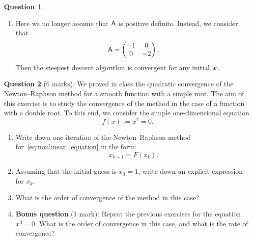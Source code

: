 \documentclass[11pt]{article}
\theoremstyle{definition}
\newtheorem{question}{Question}
\begin{document}
\begin{question}
\begin{itemize}
\begin{enumerate}
            \item
                Here we no longer assume that $\mathsf A$ is positive definite.
                Instead, we consider that
                \[
                    \mathsf A =
                    \begin{pmatrix}
                        -1 & 0 \\ 0 & -2
                    \end{pmatrix}.
                \]
                Then the steepest descent algorithm is convergent for any initial $\mathbf{\boldsymbol{x}}$.
        \end{enumerate}
    \end{itemize}
\end{question}

\newpage
\begin{question}
    [6 marks]
    We proved in class the quadratic convergence of the Newton--Raphson method for a smooth function with a simple root.
    The aim of this exercise is to study the convergence of the method in the case of a function with a double root.
    To this end, we consider the simple one-dimensional equation
    \begin{equation}
        \label{eq:nonlinear_equation}
        f(x) := x^2 = 0.
    \end{equation}
    \begin{enumerate}
        \item
            Write down one iteration of the Newton--Raphson method for~\eqref{eq:nonlinear_equation} in the form:
            \[
                x_{k+1} = F(x_k).
            \]

        \item
            Assuming that the initial guess is $x_0 = 1$,
            write down an explicit expression for $x_k$.

        \item
            What is the order of convergence of the method in this case?

        \item
            \textbf{Bonus question} (1 mark):
            Repeat the previous exercises for the equation $x^3 = 0$.
            What is the order of convergence in this case,
            and what is the rate of convergence?
    \end{enumerate}
\end{question}
\end{document}
